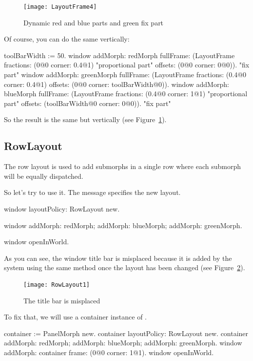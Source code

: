 \documentclass[a4paper,10pt,twoside]{book}
\begin{document}
\begin{figure}[!ht]\centering
	\texttt{[image: LayoutFrame4]}
	\caption{Dynamic red and blue parts and green fix part}
	\label{fig:layoutFrame4}
\end{figure}

Of course, you can do the same vertically:
\begin{code}{}
toolBarWidth := 50.
window
	addMorph: redMorph
	fullFrame: (LayoutFrame
				fractions: (0@0 corner: 0.4@1) "proportional part"
				offsets: (0@0 corner: 0@0)). "fix part"				
window
	addMorph: greenMorph
	fullFrame: (LayoutFrame
				fractions: (0.4@0 corner: 0.4@1)
				offsets: (0@0 corner: toolBarWidth@0)).				
window
	addMorph: blueMorph
	fullFrame: (LayoutFrame
				fractions: (0.4@0 corner: 1@1) "proportional part"
				offsets: (toolBarWidth@0 corner: 0@0)). "fix part"
\end{code}

So the result is the same but vertically (see Figure~\ref{fig:layoutFrame4}).



\subsection{RowLayout}
The row layout is used to add submorphs in a single row where each submorph will be equally dispatched.

So let's try to use it. The message  specifies the new layout.
\begin{code}{}
window layoutPolicy: RowLayout new.

window 
	addMorph: redMorph;
	addMorph: blueMorph;
	addMorph: greenMorph.

window openInWorld.
\end{code}

As you can see, the window title bar is misplaced because it is added by the system using the same method once the layout has been changed (see Figure~\ref{fig:rowLayout1}).

\begin{figure}[ht]\centering
	\texttt{[image: RowLayout1]}
	\caption{The title bar is misplaced}
	\label{fig:rowLayout1}
\end{figure}

To fix that, we will use a container instance of .
\begin{code}{}
container := PanelMorph new.
container layoutPolicy: RowLayout new.
container 
	addMorph: redMorph;
	addMorph: blueMorph;
	addMorph: greenMorph.
window
	addMorph: container
	frame: (0@0 corner: 1@1).
window openInWorld.
\end{code}
\end{document}
